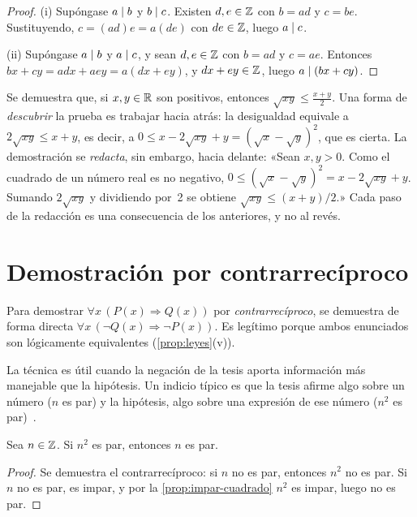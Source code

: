 \begin{proof}
(i) Supóngase $a\mid b$ y $b\mid c$. Existen $d,e\in\mathbb{Z}$ con $b=ad$ y $c=be$. Sustituyendo, $c=(ad)e=a(de)$ con $de\in\mathbb{Z}$, luego $a\mid c$.

(ii) Supóngase $a\mid b$ y $a\mid c$, y sean $d,e\in\mathbb{Z}$ con $b=ad$ y $c=ae$. Entonces $bx+cy=adx+aey=a(dx+ey)$, y $dx+ey\in\mathbb{Z}$, luego $a\mid(bx+cy)$.
\end{proof}

\begin{ejemplo}\label{ej:amgm}
Se demuestra que, si $x,y\in\mathbb{R}$ son positivos, entonces $\sqrt{xy}\le\frac{x+y}{2}$. Una forma de \emph{descubrir} la prueba es trabajar hacia atrás: la desigualdad equivale a $2\sqrt{xy}\le x+y$, es decir, a $0\le x-2\sqrt{xy}+y=(\sqrt x-\sqrt y)^{2}$, que es cierta. La demostración se \emph{redacta}, sin embargo, hacia delante: «Sean $x,y>0$. Como el cuadrado de un número real es no negativo, $0\le(\sqrt x-\sqrt y)^{2}=x-2\sqrt{xy}+y$. Sumando $2\sqrt{xy}$ y dividiendo por~2 se obtiene $\sqrt{xy}\le(x+y)/2$.» Cada paso de la redacción es una consecuencia de los anteriores, y no al revés.
\end{ejemplo}

\section{Demostración por contrarrecíproco}

\begin{definicion}\label{def:contrarreciproco}
Para demostrar $\forall x\,(P(x)\Rightarrow Q(x))$ por \emph{contrarrecíproco}, se demuestra de forma directa $\forall x\,(\neg Q(x)\Rightarrow\neg P(x))$. Es legítimo porque ambos enunciados son lógicamente equivalentes (\cref{prop:leyes}(v)).
\end{definicion}

La técnica es útil cuando la negación de la tesis aporta información más manejable que la hipótesis. Un indicio típico es que la tesis afirme algo sobre un número ($n$ es par) y la hipótesis, algo sobre una expresión de ese número ($n^{2}$ es par)~\cite[§5.1]{hammack}.

\begin{proposicion}\label{prop:cuadrado-par}
Sea $n\in\mathbb{Z}$. Si $n^{2}$ es par, entonces $n$ es par.
\end{proposicion}

\begin{proof}
Se demuestra el contrarrecíproco: si $n$ no es par, entonces $n^{2}$ no es par. Si $n$ no es par, es impar, y por la \cref{prop:impar-cuadrado} $n^{2}$ es impar, luego no es par.
\end{proof}

